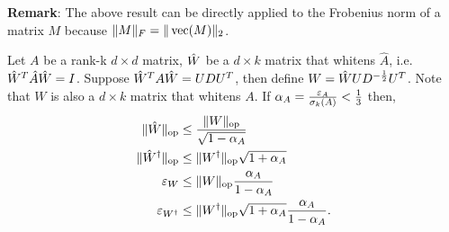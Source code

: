 
\textbf{Remark}: The above result can be directly
applied to the Frobenius norm of a matrix
$M$ because $\|M\|_F = \|\operatorname{vec}(M)\|_2$.

\begin{lemma}
  \label{lem:white}
  Let $A$ be a rank-k $d\times d$ matrix, $\hat{W}$ be a $d \times k$ matrix that
  whitens $\hat A$, i.e. $\hat{W}^T \hat{A} \hat{W} = I$.  Suppose $\hat{W}^T A \hat{W}
  = U D U^T$, then define $W = \hat{W} U D^{-\frac{1}{2}} U^T$. Note that $W$
  is also a $d \times k$ matrix that whitens $A$. If $\alpha_{A}
  = \frac{\varepsilon_{A}}{\sigma_k(A)} < \frac{1}{3}$ 
  then, 
  \begin{align*}
    \|\hat W\|_{\text{\rm op}} 
      &\le \frac{\|W\|_{\text{\rm op}}}{\sqrt{1 - \alpha_{A}} } \\
  \|{\hat W}^{\dagger}\|_{\text{\rm op}} 
    &\le \|W^{\dagger}\|_{\text{\rm op}} \sqrt{1 + \alpha_{A}} \\
    \varepsilon_{W} 
      &\le \|W\|_{\text{\rm op}} \frac{\alpha_{A}}{1 - \alpha_{A}} \\
    \varepsilon_{W^{\dagger}} 
      &\le \|W^{\dagger}\|_{\text{\rm op}} \sqrt{1 + \alpha_{A}} \frac{\alpha_{A}}{1 - \alpha_{A}}.
  \end{align*}
\end{lemma}
